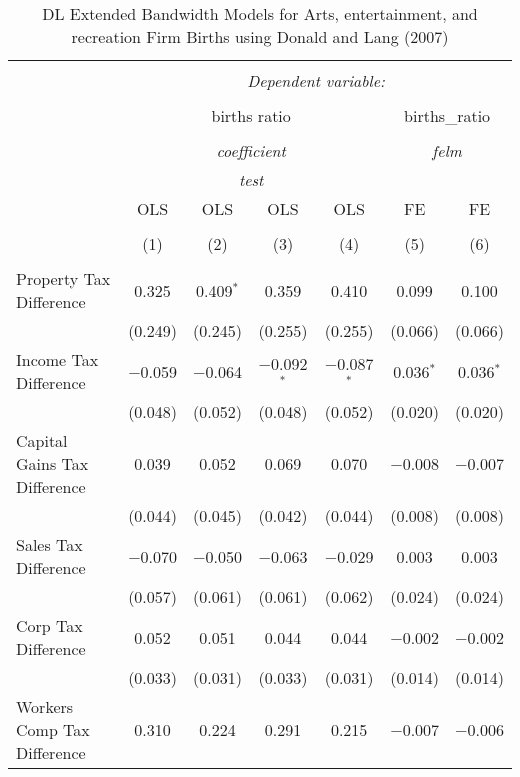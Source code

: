 
\begin{table}[!htbp] \centering 
  \caption{DL Extended Bandwidth Models for  Arts, entertainment, and recreation Firm Births using Donald and Lang (2007)} 
  \label{} 
\begin{tabular}{@{\extracolsep{5pt}}lcccccc} 
\\[-1.8ex]\hline 
\hline \\[-1.8ex] 
 & \multicolumn{6}{c}{\textit{Dependent variable:}} \\ 
\cline{2-7} 
\\[-1.8ex] & \multicolumn{4}{c}{births ratio} & \multicolumn{2}{c}{births\_ratio} \\ 
\\[-1.8ex] & \multicolumn{4}{c}{\textit{coefficient}} & \multicolumn{2}{c}{\textit{felm}} \\ 
 & \multicolumn{4}{c}{\textit{test}} & \multicolumn{2}{c}{\textit{}} \\ 
 & OLS & OLS & OLS & OLS & FE & FE \\ 
\\[-1.8ex] & (1) & (2) & (3) & (4) & (5) & (6)\\ 
\hline \\[-1.8ex] 
 Property Tax Difference & 0.325 & 0.409$^{*}$ & 0.359 & 0.410 & 0.099 & 0.100 \\ 
  & (0.249) & (0.245) & (0.255) & (0.255) & (0.066) & (0.066) \\ 
  Income Tax Difference & $-$0.059 & $-$0.064 & $-$0.092$^{*}$ & $-$0.087$^{*}$ & 0.036$^{*}$ & 0.036$^{*}$ \\ 
  & (0.048) & (0.052) & (0.048) & (0.052) & (0.020) & (0.020) \\ 
  Capital Gains Tax Difference & 0.039 & 0.052 & 0.069 & 0.070 & $-$0.008 & $-$0.007 \\ 
  & (0.044) & (0.045) & (0.042) & (0.044) & (0.008) & (0.008) \\ 
  Sales Tax Difference & $-$0.070 & $-$0.050 & $-$0.063 & $-$0.029 & 0.003 & 0.003 \\ 
  & (0.057) & (0.061) & (0.061) & (0.062) & (0.024) & (0.024) \\ 
  Corp Tax Difference & 0.052 & 0.051 & 0.044 & 0.044 & $-$0.002 & $-$0.002 \\ 
  & (0.033) & (0.031) & (0.033) & (0.031) & (0.014) & (0.014) \\ 
  Workers Comp Tax Difference & 0.310 & 0.224 & 0.291 & 0.215 & $-$0.007 & $-$0.006 \\ 

\end{tabular}
\end{table}

